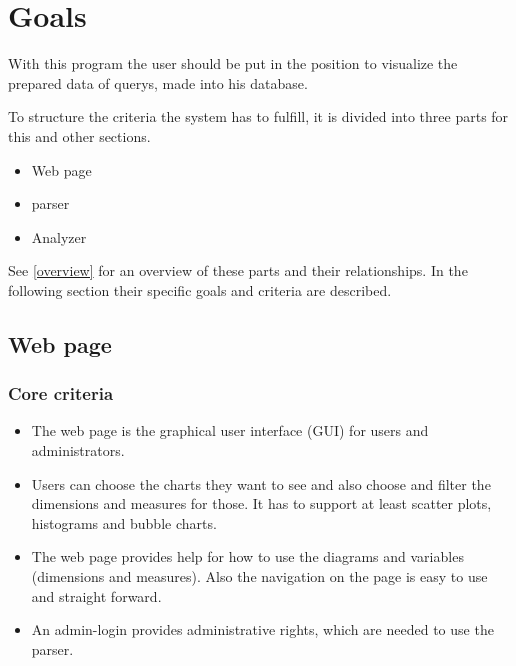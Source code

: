 \section{Goals}

 
With this program the user should be put in the position 
to visualize the prepared data of \glspl{query}, made into his \gls{database}.


To structure the criteria the system has to fulfill, 
it is divided into three parts for this and other sections.
\begin{itemize}
  \item Web page
  \item \gls{parser}
  \item Analyzer
\end{itemize}
See \ref{overview} for an overview of these parts and their relationships.
In the following section their specific goals and criteria are described.
 

% 


\subsection{Web page}
\subsubsection{Core criteria}
\begin{itemize}
\item The web page is the graphical user interface (\gls{GUI}) for users and administrators. 

\item Users can choose the \glspl{chart} they want to see 
and also choose and filter the \glspl{dimension} and \glspl{measure} for those. 
It has to support at least \glspl{scatter plot}, \glspl{histogram} and \glspl{bubble chart}.

\item The web page provides help for how to use the \glspl{diagram} and variables (\glspl{dimension} 
and measures). 
Also the navigation on the page is easy to use and straight forward.

\item An admin-login provides administrative rights, which are needed to use the \gls{parser}.
\end{itemize}

